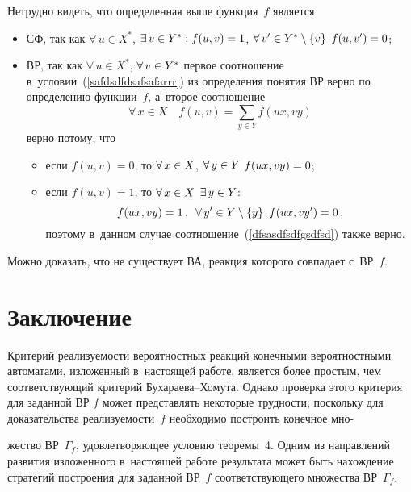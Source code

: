 \begin{multicols}{2}
Нетрудно видеть, что определенная выше функция~$f$ является
\begin{itemize}
\item
СФ, так как $\forall\, u\in X^*$, $\exists\, v\hm\in Y^*:
f(u,v)\hm=1$,  $\forall\,v'\hm\in Y^*\setminus\{v\}$ $f(u,v')\hm=0$;
\item  ВР, так как $\forall\,u\in X^*$, $\forall\,v\hm\in Y^*$ первое соотношение в~условии~(\ref{safdsdfdsafsafarrr}) из определения понятия ВР верно по
определению функции~$f$, а~второе соотношение
\begin{equation}
\label{dfsasdfsdfgsdfsd}
\forall\,x\in X\quad f(u,v)=\sum\limits_{y\in
Y}f(u x,v y)
\end{equation}
верно потому, что
\begin{itemize}
\item если $f(u,v) = 0$, то
$\forall\,x\hm\in X$, $\forall\,y\hm\in Y$  $f(ux,vy)\hm=0$;
 \item если $f(u,v) = 1$,  то $\forall\,x\hm\in X$
$\exists\,y\hm\in Y$:
$$
f(ux,vy)=1\,, \enskip \forall\,y'\in Y\setminus\{y\}\enskip
f(ux,vy')=0\,,$$
поэтому в~данном случае соотношение~(\ref{dfsasdfsdfgsdfsd})
также верно.
\end{itemize}
\end{itemize}

Можно доказать, что не существует ВА, реакция которого
совпадает с~ВР~$f$.

\vspace*{-6pt}

\section{Заключение}

Критерий реализуемости вероятностных реакций конечными
вероятностными автоматами, изложенный в~настоящей работе, является
более прос\-тым, чем соответствующий критерий Бу\-ха\-ра\-ева--Хо\-му\-та. Однако проверка этого критерия для заданной ВР $f$ может
представлять некоторые трудности, поскольку для доказательства
реализуемости~$f$ необходимо построить конечное мно-\linebreak\vspace*{-12pt}

\pagebreak

\noindent
жество ВР~$\Gamma_f$,
удовлетворяющее условию теоремы~4. Одним из
направлений развития изложенного в~настоящей работе результата может
быть нахождение стратегий построения для заданной ВР~$f$
соответствующего множества ВР~$\Gamma_f$.


\end{multicols}

